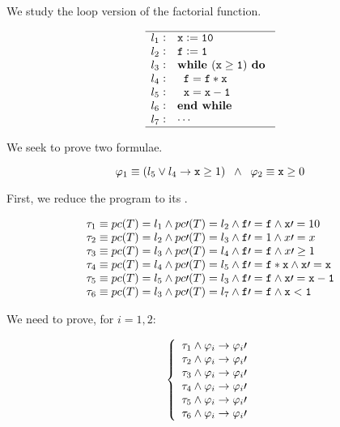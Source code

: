 


We study the loop version of the factorial function.


\[
	\begin{array}{l@{\hspace{0.3em}}c@{\hspace{1em}}l}
	\hline
		l_1 & : & \mathtt{x := 10} \\
		l_2 & : & \mathtt{f := 1} \\
		l_3 & : & \mathtt{\textbf{while } (x\geq 1) \textbf{ do }} \\
		l_4 & : & \mathtt{\;\;f = f*x} \\
		l_5 & : & \mathtt{\;\;x=x-1} \\ 	
		l_6 & : & \mathtt{\textbf{end while}}\\
		l_7 & : & \mathtt{\cdots}\\
	\hline
	\end{array}
\]
\label{simple:example}




We seek to prove two formulae.

\[\varphi_1 \equiv (l_5 \vee l_4 \to \mathtt{x}\geq 1) \;\; \wedge \;\; \varphi_2 \equiv \mathtt{x} \geq 0\]

First, we reduce the program to its \VC.


\[
	\begin{array}{l}
		 \tau_1 \equiv pc(T) = l_1 \wedge pc\prime (T) = l_2 \wedge \mathtt{f\prime =f} \wedge \mathtt{x}\prime  = 10\\
		 \tau_2 \equiv pc(T) = l_2 \wedge pc\prime (T) = l_3 \wedge \mathtt{f}\prime  = 1 \wedge x\prime =x\\
		 \tau_3 \equiv pc(T) = l_3 \wedge pc\prime (T) = l_4 \wedge \mathtt{f\prime =f} \wedge x\prime \geq 1\\
		 \tau_4 \equiv pc(T) = l_4 \wedge pc\prime (T) = l_5 \wedge \mathtt{f}\prime  = \mathtt{f*x} \wedge \mathtt{x\prime =x}\\
		 \tau_5 \equiv pc(T) = l_5 \wedge pc\prime (T) = l_3 \wedge \mathtt{f\prime =f} \wedge \mathtt{x\prime =x-1}\\
		 \tau_6 \equiv pc(T) = l_3 \wedge pc\prime (T) = l_7 \wedge \mathtt{f\prime =f} \wedge \mathtt{x<1}
	\end{array}
\]

We need to prove, for $i=1,2$:

\[
	\left\{
		\begin{array}{l}
			\tau_1 \wedge \varphi_i \to \varphi_i\prime  \\
			\tau_2 \wedge \varphi_i \to \varphi_i\prime \\
			\tau_3 \wedge \varphi_i \to \varphi_i\prime  \\
			\tau_4 \wedge \varphi_i \to \varphi_i\prime \\
			\tau_5 \wedge \varphi_i \to \varphi_i\prime  \\
			\tau_6 \wedge \varphi_i \to \varphi_i\prime 
		\end{array}
	\right.
\]

